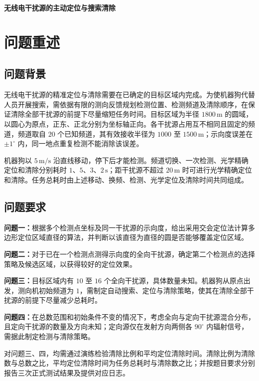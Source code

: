 \documentclass[UTF8,a4paper,zihao=5,fontset=fandol]{ctexart}
\begin{document}
\begin{center}
{\fontsize{16pt}{20pt}\selectfont\bfseries 无线电干扰源的主动定位与搜索清除\par}
\vspace{5pt}
\end{center}
\section{问题重述}\label{sec:problem-restatement}
\subsection{问题背景}

无线电干扰源的精准定位与清除需要在已确定的目标区域内完成。为使机器狗代替人员开展搜索，需依据有限的测向反馈规划检测位置、检测频道及清除顺序，在保证清除全部干扰源的前提下尽量缩短任务时间。目标区域为半径 $1800\,\mathrm{m}$ 的圆域，以圆心为原点，正东、正北分别为坐标轴正向。各干扰源占用互不相同且固定的频道，频道取自 $20$ 个已知频道，其有效接收半径为 $1000$ 至 $1500\,\mathrm{m}$；示向度误差在 $\pm1^\circ$ 内，同一地点重复检测不能消除该误差。

机器狗以 $5\,\mathrm{m/s}$ 沿直线移动，停下后才能检测。频道切换、一次检测、光学精确定位和清除分别耗时 $1$、$5$、$3$、$2\,\mathrm{s}$；距干扰源不超过 $20\,\mathrm{m}$ 时可进行光学精确定位和清除。任务总耗时由上述移动、换频、检测、光学定位及清除时间共同组成。

\subsection{问题要求}

\textbf{问题一：}根据多个检测点坐标及同一干扰源的示向度，给出采用交会定位法计算多边形定位区域直径的算法，并判断以该直径为直径的圆是否能够覆盖定位区域。

\textbf{问题二：}对于已在一个检测点测得示向度的全向干扰源，确定第二个检测点的选择策略及候选区域，以获得较好的定位效果。

\textbf{问题三：}目标区域内有 $10$ 至 $16$ 个全向干扰源，具体数量未知。机器狗从原点出发，测向机初始频道为 $1$，需制定自动搜索、定位与清除策略，使其在清除全部干扰源的前提下尽量减少总耗时。

\textbf{问题四：}在总数范围和初始条件不变的情况下，考虑全向与定向干扰源混合分布，且定向干扰源的数量及方向未知；定向源仅在发射方向两侧各 $90^\circ$ 内辐射信号，需据此制定检测与清除策略。

对问题三、四，均需通过演练检验清除比例和平均定位清除时间。清除比例为清除数与总数之比，平均定位清除时间为任务总耗时与清除数之比；并按题目要求分别报告三次正式测试结果及提供对应日志。
\end{document}
